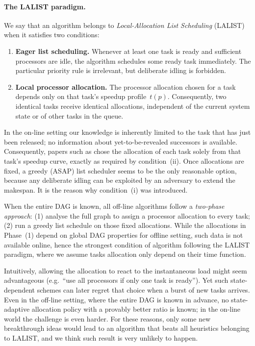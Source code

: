 \documentclass{article}
\begin{document}
\paragraph{The \textsc{LALIST} paradigm.}
We say that an algorithm belongs to \emph{Local-Allocation List Scheduling} (\textsc{LALIST}) when it satisfies two conditions:
\begin{enumerate}[label=(\roman*)]
    \item \textbf{Eager list scheduling.}  
          Whenever at least one task is ready and sufficient processors are idle, the algorithm schedules some ready task immediately.  The particular priority rule is irrelevant, but deliberate idling is forbidden.
    \item \textbf{Local processor allocation.}  
          The processor allocation chosen for a task depends only on that task’s speedup profile~$t(p)$.  Consequently, two identical tasks receive identical allocations, independent of the current system state or of other tasks in the queue.
\end{enumerate}

In the on-line setting our knowledge is inherently limited to the task that has
just been released; no information about yet-to-be-revealed successors is
available.
Consequently, papers such as \cite{ICPP22,TOPC24}  chose the
allocation of each task solely from that task’s speedup curve, exactly as
required by condition~(ii).
Once allocations are fixed, a greedy (ASAP) list scheduler seems to be the only
reasonable option, because any deliberate idling can be exploited by an
adversary to extend the makespan. It is the reason why condition~(i) was introduced.



When the entire DAG is known, all off-line algorithms follow a
\emph{two-phase approach}:
(1) analyse the full graph to assign a processor allocation to every task;
(2) run a greedy list schedule on those fixed allocations.\cite{Wang92_DAG,Chen13_concave, Lepere01_DAG, Jansen06_DAG}
While the allocations in Phase~(1) depend on global DAG properties for offline setting,
such data is not available online, hence the strongest condition of algorithm following the \textsc{LALIST} paradigm, where we assume tasks allocation only depend on their time function.

Intuitively, allowing the allocation to react to the instantaneous load might seem advantageous (e.g.\ ``use all processors if only one task is ready'').  Yet such state-dependent schemes can later regret that choice when a burst of new tasks arrives.  
Even in the off-line setting, where the entire DAG is known in advance, no state-adaptive allocation policy with a provably better ratio is known; in the on-line world the challenge is even harder.
For these reasons, only some new breakthrough ideas would lead to an algorithm that beats all heuristics belonging to \textsc{LALIST}, and we think such result is very unlikely to happen.
\end{document}
